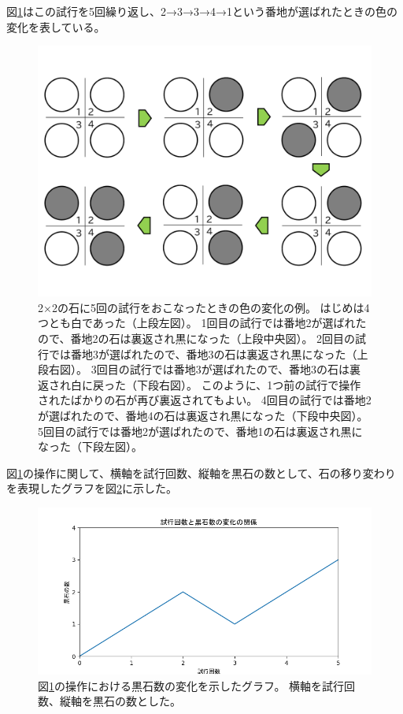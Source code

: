 \documentclass[luatexja,fontsize=12pt]{jlreq}\usepackage{ifthen}\newcounter{enlarge}\setcounter{enlarge}{1}
\begin{document}
図\ref{f:2}はこの試行を5回繰り返し、2→3→3→4→1という番地が選ばれたときの色の変化を表している。
\begin{figure}[] 
\centering 
\includegraphics[width=10truecm]{f2.pdf}
\captionsetup{width=.9\linewidth}
\caption{%
2×2の石に5回の試行をおこなったときの色の変化の例。
はじめは4つとも白であった（上段左図）。
1回目の試行では番地2が選ばれたので、番地2の石は裏返され黒になった（上段中央図）。
2回目の試行では番地3が選ばれたので、番地3の石は裏返され黒になった（上段右図）。
3回目の試行では番地3が選ばれたので、番地3の石は裏返され白に戻った（下段右図）。
このように、1つ前の試行で操作されたばかりの石が再び裏返されてもよい。
4回目の試行では番地2が選ばれたので、番地4の石は裏返され黒になった（下段中央図）。
5回目の試行では番地2が選ばれたので、番地1の石は裏返され黒になった（下段左図）。
}
\label{f:2}
\end{figure}%

図\ref{f:2}の操作に関して、横軸を試行回数、縦軸を黒石の数として、石の移り変わりを表現したグラフを図\ref{f:3}に示した。
\begin{figure}[] 
\centering 
\includegraphics[width=14truecm]{f3.png}
\captionsetup{width=.9\linewidth}
\caption{%
図\ref{f:2}の操作における黒石数の変化を示したグラフ。
横軸を試行回数、縦軸を黒石の数とした。
}
\label{f:3}
\end{figure}%
\end{document}
